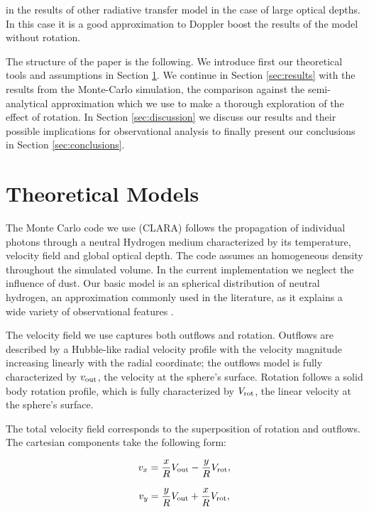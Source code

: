 \documentclass[a4paper,fleqn,usenatbib]{mnras}
\begin{document}
in the results of other radiative transfer model in the case of large
optical depths.
In this case it is a good approximation to Doppler
boost the results of the model without rotation.

The structure of the paper is the following.
We introduce first our theoretical tools and assumptions
in Section \ref{sec:theory}. We continue in Section  \ref{sec:results}
with the results from the Monte-Carlo simulation, the comparison
against the semi-analytical approximation which we use to make a
thorough exploration of the effect of rotation.
In Section \ref{sec:discussion} we discuss our results and their
possible implications for observational analysis to finally present
our conclusions in Section \ref{sec:conclusions}.


\section{Theoretical Models}
\label{sec:theory}


The Monte Carlo code we use (CLARA)  follows the propagation of
individual photons through a neutral Hydrogen medium characterized by
its temperature, velocity field and global optical depth.
The code assumes an homogeneous density throughout the simulated
volume.
In the current implementation we neglect the influence of dust.
Our basic model is an spherical distribution of neutral hydrogen,
an approximation commonly used in the literature, as it explains a
wide variety of observational features
\citep{Ahn03,Verhamme06,Dijkstra06}. 


The velocity field we use captures both outflows and rotation.
Outflows are described by a Hubble-like radial velocity profile with
the velocity magnitude increasing linearly with the radial
coordinate; the outflows model is fully characterized by $v_{\rm out}$, the
velocity at the sphere's surface.
Rotation follows a solid body rotation profile, which is fully
characterized by $V_{\rm rot}$, the linear velocity at the sphere's surface.

The total velocity field corresponds to the superposition of rotation and
outflows.
The cartesian components take the following form:

\begin{equation}
	v_{x}=\frac{x}{R}V_{\rm out}-\frac{y}{R}V_{\rm rot} ,
	\label{eq:vx}
\end{equation}

\begin{equation}
	v_{y}=\frac{y}{R}V_{\rm out}+\frac{x}{R}V_{\rm rot} ,
	\label{eq:vy}
\end{equation}
\end{document}
